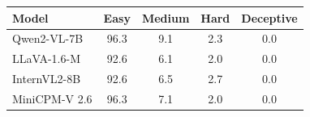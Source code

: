 \begin{tabular}{lcccc}
\toprule
Model & Easy & Medium & Hard & Deceptive \\
\midrule
Qwen2-VL-7B & 96.3 & 9.1 & 2.3 & 0.0 \\
LLaVA-1.6-M & 92.6 & 6.1 & 2.0 & 0.0 \\
InternVL2-8B & 92.6 & 6.5 & 2.7 & 0.0 \\
MiniCPM-V 2.6 & 96.3 & 7.1 & 2.0 & 0.0 \\
\bottomrule
\end{tabular}